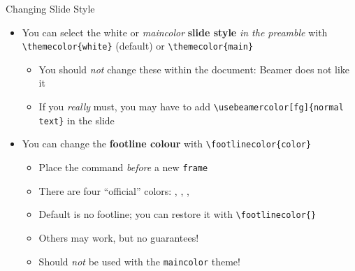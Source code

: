 \begin{frame}[fragile]{Changing Slide Style}
\begin{itemize}
\item You can select the white or \textit{maincolor} \textbf{slide style} \emph{in the 
preamble} with \verb|\themecolor{white}| (default) or \verb|\themecolor{main}|
      \begin{itemize}
      \item You should \emph{not} change these within the document: Beamer does 
      not like it
      \item If you \emph{really} must, you may have to add 
      \verb|\usebeamercolor[fg]{normal text}| in the slide
      \end{itemize}
\item You can change the \textbf{footline colour} with 
\verb|\footlinecolor{color}|
      \begin{itemize}
      \item Place the command \emph{before} a new \verb|frame|
      \item There are four ``official'' colors: 
      , , 
      , 
      \item Default is no footline; you can restore it with 
      \verb|\footlinecolor{}|
      \item Others may work, but no guarantees!
      \item Should \emph{not} be used with the \verb|maincolor| theme!
      \end{itemize}
\end{itemize}
\end{frame}

